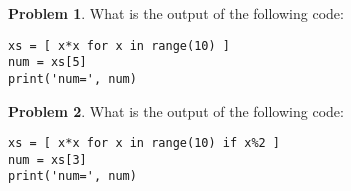\documentclass[10pt]{article}
\theoremstyle{definition}
\newtheorem{problem}{Problem}
\begin{document}
\begin{problem}
    What is the output of the following code:
\end{problem}
\begin{lstlisting}
xs = [ x*x for x in range(10) ]
num = xs[5]
print('num=', num)
\end{lstlisting}
\vspace{2.5in}

\begin{problem}
    What is the output of the following code:
\end{problem}
\begin{lstlisting}
xs = [ x*x for x in range(10) if x%2 ]
num = xs[3]
print('num=', num)
\end{lstlisting}
\vspace{2.5in}

\end{document}
